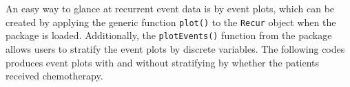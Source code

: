 An easy way to glance at recurrent event data is by event plots, which
can be created by applying the generic function \texttt{plot()} to the
\texttt{Recur} object when the  package is loaded.
Additionally, the \texttt{plotEvents()} function from the 
package allows users to stratify the event plots by discrete variables.
The following codes produces event plots with and without stratifying by
whether the patients received chemotherapy.

\begin{Shaded}
\end{Shaded}

